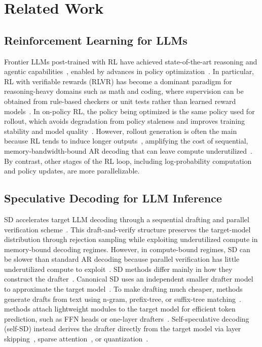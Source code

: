 \section{Related Work}
\label{sec:related-work}

\subsection{Reinforcement Learning for LLMs}

Frontier LLMs post-trained with RL have achieved state-of-the-art reasoning and agentic capabilities~\citep{guo2025deepseek,yang2025qwen3,team2025kimi,zeng2025glm}, enabled by advances in policy optimization~\citep{schulman2017proximal,shao2024deepseekmath,yu2025dapo,chen2025minimax}.
In particular, RL with verifiable rewards (RLVR) has become a dominant paradigm for reasoning-heavy domains such as math and coding, where supervision can be obtained from rule-based checkers or unit tests rather than learned reward models~\citep{wen2025reinforcement,guo2025deepseek}.
In on-policy RL, the policy being optimized is the same policy used for rollout, which avoids degradation from policy staleness and improves training stability and model quality~\citep{kumar2025llm,fu2025areal}.
However, rollout generation is often the main \bottleneck{} because RL tends to induce longer outputs~\citep{chen2024not,liu2025understanding}, amplifying the cost of sequential, memory-bandwidth-bound AR decoding that can leave compute underutilized~\citep{gholami2024ai}.
By contrast, other stages of the RL loop, including log-probability computation and policy updates, are more parallelizable.

\subsection{Speculative Decoding for LLM Inference}

SD accelerates target LLM decoding through a sequential drafting and parallel verification scheme~\citep{leviathan2023fast,chen2023accelerating}.
This draft-and-verify structure preserves the target-model distribution through rejection sampling while exploiting underutilized compute in memory-bound decoding regimes.
However, in compute-bound regimes, SD can be slower than standard AR decoding because parallel verification has little underutilized compute to exploit~\citep{sadhukhan2024magicdec}.
SD methods differ mainly in how they construct the drafter~\citep{xia2024unlocking}.
Canonical SD uses an independent smaller drafter model to approximate the target model~\citep{leviathan2023fast,chen2023accelerating}.
To make drafting much cheaper, \nonparametric{} methods generate drafts from text using n-gram, prefix-tree, or suffix-tree matching~\citep{he2024rest,ou2024lossless,stewart2024n}.
\Learned{} methods attach lightweight modules to the target model for efficient token prediction, such as FFN heads or one-layer drafters~\citep{li2024eagle,cai2024medusa}.
Self-speculative decoding (self-SD) instead derives the drafter directly from the target model via layer skipping~\citep{zhang2024draft}, sparse attention~\citep{yue2026specattn}, or quantization~\citep{tiwari2025quantspec}.

